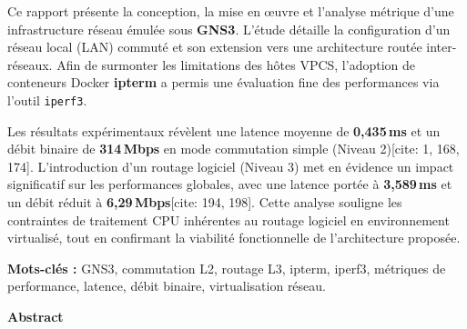 \documentclass[11pt,a4paper,oneside]{report}
\begin{document}
\begin{tcolorbox}[keyresult, title={R\'{e}sum\'{e} ex\'{e}cutif}]
{\small
Ce rapport pr\'{e}sente la conception, la mise en \oe{}uvre et l'analyse m\'{e}trique d'une infrastructure r\'{e}seau \'{e}mul\'{e}e sous \textbf{GNS3}. L'\'{e}tude d\'{e}taille la configuration d'un r\'{e}seau local (LAN) commut\'{e} et son extension vers une architecture rout\'{e}e inter-r\'{e}seaux. Afin de surmonter les limitations des h\^{o}tes VPCS, l'adoption de conteneurs Docker \textbf{ipterm} a permis une \'{e}valuation fine des performances via l'outil \texttt{iperf3}.

Les r\'{e}sultats exp\'{e}rimentaux r\'{e}v\`{e}lent une latence moyenne de \textbf{0,435\,ms} et un d\'{e}bit binaire de \textbf{314\,Mbps} en mode commutation simple (Niveau 2)[cite: 1, 168, 174]. L'introduction d'un routage logiciel (Niveau 3) met en \'{e}vidence un impact significatif sur les performances globales, avec une latence port\'{e}e \`{a} \textbf{3,589\,ms} et un d\'{e}bit r\'{e}duit \`{a} \textbf{6,29\,Mbps}[cite: 194, 198]. Cette analyse souligne les contraintes de traitement CPU inh\'{e}rentes au routage logiciel en environnement virtualis\'{e}, tout en confirmant la viabilit\'{e} fonctionnelle de l'architecture propos\'{e}e.
}
\end{tcolorbox}

\vspace{3pt}
\noindent\textbf{Mots-cl\'{e}s :} GNS3, commutation L2, routage L3, ipterm, iperf3, m\'{e}triques de performance, latence, d\'{e}bit binaire, virtualisation r\'{e}seau.











\vspace{2cm}

{\Large\bfseries\color{univblue} Abstract}
\end{document}

